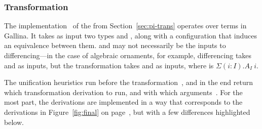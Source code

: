 \subsubsection{Transformation}
\label{sec:pi-details-trans}

The implementation~\href{https://github.com/uwplse/pumpkin-pi/blob/v2.0.0/plugin/src/automation/lift/lift.ml}{}
of the  from Section~\ref{sec:pi-trans} operates over terms in Gallina.
It takes as input two types \Aa and \B, along with a configuration that induces an equivalence between them.
\Aa and \B may not necessarily be the inputs to differencing---in the case of algebraic ornaments, for example,
differencing takes \Aa and \AI as inputs, but the transformation takes \Aa and \B as inputs,
where \B is $\Sigma (i : I).A_I\ i$.

The unification heuristics run before the transformation~\href{https://github.com/uwplse/pumpkin-pi/blob/v2.0.0/plugin/src/automation/lift/liftconfig.ml}{},
and in the end return which transformation derivation to run,
and with which arguments~\href{https://github.com/uwplse/pumpkin-pi/blob/v2.0.0/plugin/src/automation/lift/liftrules.ml}{}.
For the most part, the derivations are implemented in a way that corresponds to the derivations in Figure~\ref{fig:final}
on page~\pageref{fig:final}, but with a few differences highlighted below.


